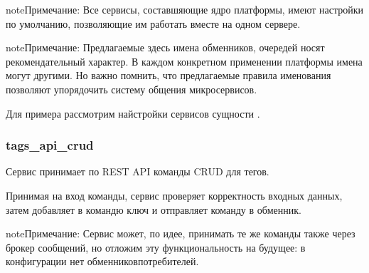 \documentclass[a4paper,10pt,russian]{sphinxmanual}
\begin{document}
\begin{sphinxadmonition}{note}{Примечание:}
\sphinxAtStartPar
Все сервисы, составшяющие ядро платформы, имеют настройки по умолчанию,
позволяющие им работать вместе на одном сервере.
\end{sphinxadmonition}

\begin{sphinxadmonition}{note}{Примечание:}
\sphinxAtStartPar
Предлагаемые здесь имена обменников, очередей носят рекомендательный
характер. В каждом конкретном применении платформы имена могут другими.
Но важно помнить, что предлагаемые правила именования позволяют
упорядочить систему общения микросервисов.
\end{sphinxadmonition}

\sphinxAtStartPar
Для примера рассмотрим найстройки сервисов сущности .


\subsubsection{tags\_api\_crud}
\label{\detokenize{architecture:tags-api-crud}}
\sphinxAtStartPar
Сервис принимает по REST API команды CRUD для тегов.

\sphinxAtStartPar
Принимая на вход команды, сервис проверяет корректность входных данных,
затем добавляет в командю ключ  и отправляет команду в обменник.

\begin{sphinxVerbatim}[commandchars=\\\{\}]
\end{sphinxVerbatim}

\begin{sphinxadmonition}{note}{Примечание:}
\sphinxAtStartPar
Сервис может, по идее, принимать те же команды также через брокер сообщений,
но отложим эту функциональность на будущее: в конфигурации нет
обменников\sphinxhyphen{}потребителей.
\end{sphinxadmonition}
\end{document}
